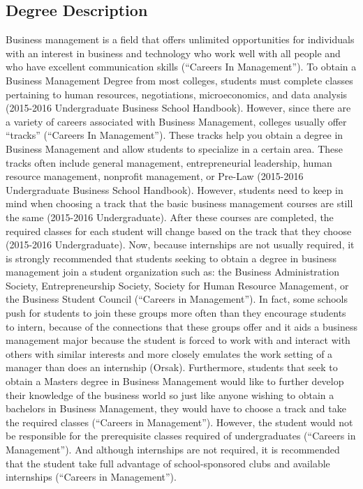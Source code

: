 \begin{multicols}{2}

\section{Degree Description}
    Business management is a field that offers unlimited opportunities for individuals with an interest in business and technology who work well with all people and who have excellent communication skills (“Careers In Management”). To obtain a Business Management Degree from most colleges, students must complete classes pertaining to human resources, negotiations, microeconomics, and data analysis (2015-2016 Undergraduate Business School Handbook). However, since there are a variety of careers associated with Business Management, colleges usually offer “tracks” (“Careers In Management”). These tracks help you obtain a degree in Business Management and allow students to specialize in a certain area. These tracks often include general management, entrepreneurial leadership, human resource management, nonprofit management, or Pre-Law (2015-2016 Undergraduate Business School Handbook). However, students need to keep in mind when choosing a track that the basic business management courses are still the same (2015-2016 Undergraduate). After these courses are completed, the required classes for each student will change based on the track that they choose (2015-2016 Undergraduate). Now, because internships are not usually required, it is strongly recommended that students seeking to obtain a degree in business management join a student organization such as: the Business Administration Society, Entrepreneurship Society, Society for Human Resource Management, or the Business Student Council (“Careers in Management”). In fact, some schools push for students to join these groups more often than they encourage students to intern, because of the connections that these groups offer and it aids a business management major because the student is forced to work with and interact with others with similar interests and more closely emulates the work setting of a manager than does an internship (Orsak). Furthermore, students that seek to obtain a Masters degree in Business Management would like to further develop their knowledge of the business world so just like anyone wishing to obtain a bachelors in Business Management, they would have to choose a track and take the required classes (“Careers in Management”). However, the student would not be responsible for the prerequisite classes required of undergraduates (“Careers in Management”). And although internships are not required, it is recommended that the student take full advantage of school-sponsored clubs and available internships (“Careers in Management”).

\end{multicols}

